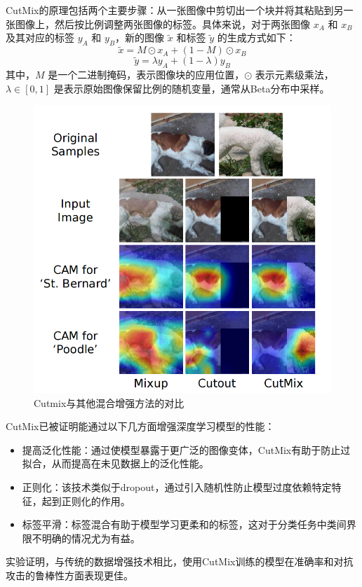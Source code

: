 \documentclass[notitlepage,cs4size,punct,oneside]{ctexrep}
\numberwithin{equation}{chapter}
\theoremstyle{mystyle}
\begin{document}
CutMix的原理包括两个主要步骤：从一张图像中剪切出一个块并将其粘贴到另一张图像上，然后按比例调整两张图像的标签。具体来说，对于两张图像 $x_A$ 和 $x_B$ 及其对应的标签 $y_A$ 和 $y_B$，新的图像 $\tilde{x}$ 和标签 $\tilde{y}$ 的生成方式如下：
\begin{equation}
\tilde{x} = M \odot x_A + (1 - M) \odot x_B
\end{equation}
\begin{equation}
\tilde{y} = \lambda y_A + (1 - \lambda) y_B
\end{equation}
其中，$M$ 是一个二进制掩码，表示图像块的应用位置，$\odot$ 表示元素级乘法，$\lambda \in [0, 1]$ 是表示原始图像保留比例的随机变量，通常从Beta分布中采样。
\begin{figure}[H]
    \centering
    \includegraphics[scale=0.7]{cutmix.png}
    \caption{Cutmix与其他混合增强方法的对比}
\end{figure}

CutMix已被证明能通过以下几方面增强深度学习模型的性能：
\begin{itemize}
    \item 提高泛化性能：通过使模型暴露于更广泛的图像变体，CutMix有助于防止过拟合，从而提高在未见数据上的泛化性能。
    \item 正则化：该技术类似于dropout，通过引入随机性防止模型过度依赖特定特征，起到正则化的作用。
    \item 标签平滑：标签混合有助于模型学习更柔和的标签，这对于分类任务中类间界限不明确的情况尤为有益。
\end{itemize}
实验证明，与传统的数据增强技术相比，使用CutMix训练的模型在准确率和对抗攻击的鲁棒性方面表现更佳。
\end{document}
